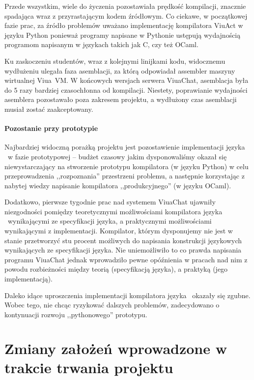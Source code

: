 Przede wszystkim, wiele do życzenia pozostawiała prędkość kompilacji, znacznie
spadająca wraz z przyrastającym kodem źródłowym. Co ciekawe, w początkowej fazie
prac, za źródło problemów uważano implementację kompilatora ViuAct w języku
Python ponieważ programy napisane w Pythonie ustępują wydajnością programom
napisanym w językach takich jak C, czy też OCaml.

Ku zaskoczeniu studentów, wraz z kolejnymi linijkami kodu, widocznemu wydłużeniu
ulegała faza asemblacji, za którą odpowiadał assembler maszyny wirtualnej
Viua~VM. W końcowych wersjach serwera ViuaChat, asemblacja była do 5 razy
bardziej czasochłonna od kompilacji. Niestety, poprawianie wydajności asemblera
pozostawało poza zakresem projektu, a wydłużony czas asemblacji musiał zostać
zaakceptowany.

\paragraph*{Pozostanie przy prototypie}

Najbardziej widoczną porażką projektu jest pozostawienie implementacji języka
\ViuAct\ w fazie prototypowej -- budżet czasowy jakim dysponowaliśmy okazał się
niewystarczający na stworzenie prototypu kompilatora (w języku Python) w celu
przeprowadzenia ,,rozpoznania'' przestrzeni problemu, a następnie korzystając z
nabytej wiedzy napisanie kompilatora ,,produkcyjnego'' (w języku OCaml).

Dodatkowo, pierwsze tygodnie prac nad systemem ViuaChat ujawniły niezgodności
pomiędzy teoretycznymi możliwościami kompilatora języka \ViuAct\ wynikającymi ze
specyfikacji języka, a praktycznymi możliwościami wynikającymi z implementacji.
Kompilator, którym dysponujemy nie jest w stanie przetworzyć stu procent możliwych do napisania konstrukcji
językowych wynikających ze specyfikacji języka. Nie uniemożliwiło to co prawda
napisania programu ViuaChat jednak wprowadziło pewne opóźnienia w pracach nad
nim z powodu rozbieżności między teorią (specyfikacją języka), a praktyką (jego
implementacją).

Daleko idące uproszczenia implementacji kompilatora języka \ViuAct\ okazały się
zgubne. Wobec tego, nie chcąc ryzykować dalszych problemów, zadecydowano
o kontynuacji rozwoju ,,pythonowego'' prototypu.


\section{Zmiany założeń wprowadzone w trakcie trwania projektu}

